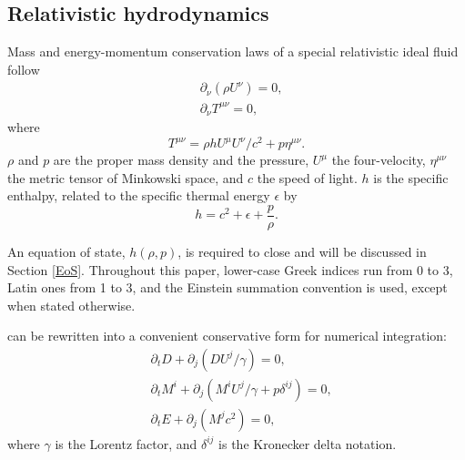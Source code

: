 \documentclass[twocolumn]{aastex63}
\begin{document}
\subsection{Relativistic hydrodynamics}
\label{Relativistic Hydrodynamics}
Mass and energy-momentum conservation laws of a special relativistic ideal fluid follow
\begin{subequations}
\label{eq:conservation laws}
\begin{align}
&\partial_{\nu}\left(\rho U^{\nu}\right)=0, \label{eq:number conservation}\\
&\partial_{\nu}T^{\mu \nu} = 0, \label{eq:energy conservation}
\end{align}
\end{subequations}
where
\begin{equation}
T^{\mu \nu} = \rho h U^{\mu} U^{\nu}/c^2 + p \eta^{\mu \nu}.
\end{equation}
$\rho$ and $p$ are the proper mass density and the pressure, $U^\mu$ the four-velocity, $\eta^{\mu \nu}$ the metric tensor of Minkowski space, and $c$ the speed of light. $h$ is the specific enthalpy, related to the specific thermal energy $\epsilon$ by
\begin{equation}
  h=c^2+\epsilon +\frac{p}{\rho}.
  \label{eq:eos}
\end{equation}

An equation of state, $h\left(\rho, p\right)$, is required to close  and will be discussed in Section \ref{EoS}.
Throughout this paper, lower-case Greek indices run from 0 to 3, Latin ones from 1 to 3, and the Einstein summation convention is used, except when stated otherwise.

 can be rewritten into a convenient conservative form for numerical integration:
\begin{subequations}
  \label{conservative form}
  \begin{align}
   &\partial_{t} D+\partial_{j} \left(DU^{j}/\gamma\right)=0,\label{D evolution}\\
   &\partial_{t}M^{i}+\partial_{j} \left(M^{i}U^{j}/\gamma+p\delta^{ij}\right)=0,\label{M evolution}\\
   &\partial_t E+\partial_j  \left(M^{j}c^2\right)=0, \label{E evoltion}
  \end{align}
\end{subequations}
where $\gamma$ is the Lorentz factor, and $\delta^{ij}$ is the Kronecker delta notation.
\end{document}
